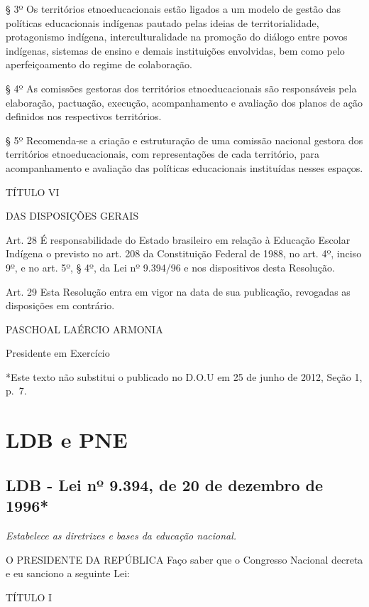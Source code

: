 \documentclass[
]{book}
\begin{document}
§ 3º Os territórios etnoeducacionais estão ligados a um modelo de gestão das políticas educacionais indígenas pautado pelas ideias de territorialidade, protagonismo indígena, interculturalidade na promoção do diálogo entre povos indígenas, sistemas de ensino e demais instituições envolvidas, bem como pelo aperfeiçoamento do regime de colaboração.

§ 4º As comissões gestoras dos territórios etnoeducacionais são responsáveis pela elaboração, pactuação, execução, acompanhamento e avaliação dos planos de ação definidos nos respectivos territórios.

§ 5º Recomenda-se a criação e estruturação de uma comissão nacional gestora dos territórios etnoeducacionais, com representações de cada território, para acompanhamento e avaliação das políticas educacionais instituídas nesses espaços.

TÍTULO VI

DAS DISPOSIÇÕES GERAIS

Art. 28 É responsabilidade do Estado brasileiro em relação à Educação Escolar Indígena o previsto no art. 208 da Constituição Federal de 1988, no art. 4º, inciso 9º, e no art. 5º, § 4º, da Lei nº 9.394/96 e nos dispositivos desta Resolução.

Art. 29 Esta Resolução entra em vigor na data de sua publicação, revogadas as disposições em contrário.

PASCHOAL LAÉRCIO ARMONIA

Presidente em Exercício

*Este texto não substitui o publicado no D.O.U em 25 de junho de 2012, Seção 1, p.~7.

\hypertarget{ldb-e-pne}{%
\chapter{LDB e PNE}\label{ldb-e-pne}}

\hypertarget{ldb---lei-nuxba-9.394-de-20-de-dezembro-de-1996}{%
\section{LDB - Lei nº 9.394, de 20 de dezembro de 1996*}\label{ldb---lei-nuxba-9.394-de-20-de-dezembro-de-1996}}

\emph{Estabelece as diretrizes e bases da educação nacional.}

O PRESIDENTE DA REPÚBLICA Faço saber que o Congresso Nacional decreta e eu sanciono a seguinte Lei:

TÍTULO I
\end{document}

